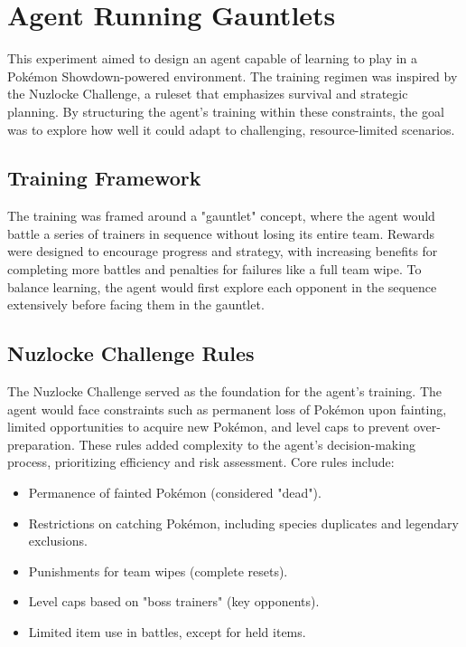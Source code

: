 \section{Agent Running Gauntlets}

This experiment aimed to design an agent capable of learning to play in a Pokémon Showdown-powered environment. The training regimen was inspired by the Nuzlocke Challenge, a ruleset that emphasizes survival and strategic planning. By structuring the agent’s training within these constraints, the goal was to explore how well it could adapt to challenging, resource-limited scenarios.

\subsection{Training Framework}
The training was framed around a "gauntlet" concept, where the agent would battle a series of trainers in sequence without losing its entire team. Rewards were designed to encourage progress and strategy, with increasing benefits for completing more battles and penalties for failures like a full team wipe. To balance learning, the agent would first explore each opponent in the sequence extensively before facing them in the gauntlet.

\subsection{Nuzlocke Challenge Rules}

The Nuzlocke Challenge served as the foundation for the agent’s training. The agent would face constraints such as permanent loss of Pokémon upon fainting, limited opportunities to acquire new Pokémon, and level caps to prevent over-preparation. These rules added complexity to the agent's decision-making process, prioritizing efficiency and risk assessment. Core rules include:
\begin{itemize}
    \item Permanence of fainted Pokémon (considered "dead").
    \item Restrictions on catching Pokémon, including species duplicates and legendary exclusions.
    \item Punishments for team wipes (complete resets).
    \item Level caps based on "boss trainers" (key opponents).
    \item Limited item use in battles, except for held items.
\end{itemize}

